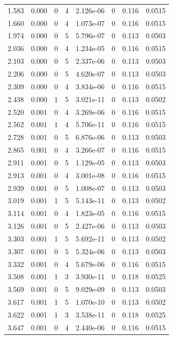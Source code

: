 \documentclass[preview]{standalone}
\begin{document}
{{\begin{tabular}{L{1.2cm}C{1.2cm} C{0.3cm}C{0.5cm} C{1.4cm}C{1.4cm} C{1.4cm}C{1.4cm}}
  1.583  &  0.000  & 0     &  4 &  2.126e-06  & 0  & 0.116 &  0.0515   \\ 
  1.660  &  0.000  & 0     &  4 &  1.073e-07  & 0  & 0.116 &  0.0515   \\ 
  1.974  &  0.000  & 0     &  5 &  5.796e-07  & 0  & 0.113 &  0.0503   \\ 
  2.036  &  0.000  & 0     &  4 &  1.234e-05  & 0  & 0.116 &  0.0515   \\ 
  2.103  &  0.000  & 0     &  5 &  2.337e-06  & 0  & 0.113 &  0.0503   \\ 
  2.206  &  0.000  & 0     &  5 &  4.620e-07  & 0  & 0.113 &  0.0503   \\ 
  2.309  &  0.000  & 0     &  4 &  3.834e-06  & 0  & 0.116 &  0.0515   \\ 
  2.438  &  0.000  & 1     &  5 &  3.021e-11  & 0  & 0.113 &  0.0502   \\ 
  2.520  &  0.001  & 0     &  4 &  3.269e-06  & 0  & 0.116 &  0.0515   \\ 
  2.562  &  0.001  & 1     &  4 &  5.706e-11  & 0  & 0.116 &  0.0515   \\ 
  2.728  &  0.001  & 0     &  5 &  6.876e-06  & 0  & 0.113 &  0.0503   \\ 
  2.865  &  0.001  & 0     &  4 &  3.266e-07  & 0  & 0.116 &  0.0515   \\ 
  2.911  &  0.001  & 0     &  5 &  1.129e-05  & 0  & 0.113 &  0.0503   \\ 
  2.913  &  0.001  & 0     &  4 &  3.001e-08  & 0  & 0.116 &  0.0515   \\ 
  2.939  &  0.001  & 0     &  5 &  1.008e-07  & 0  & 0.113 &  0.0503   \\ 
  3.019  &  0.001  & 1     &  5 &  5.143e-11  & 0  & 0.113 &  0.0502   \\ 
  3.114  &  0.001  & 0     &  4 &  1.823e-05  & 0  & 0.116 &  0.0515   \\ 
  3.126  &  0.001  & 0     &  5 &  2.427e-06  & 0  & 0.113 &  0.0503   \\ 
  3.303  &  0.001  & 1     &  5 &  5.692e-11  & 0  & 0.113 &  0.0502   \\ 
  3.307  &  0.001  & 0     &  5 &  5.324e-06  & 0  & 0.113 &  0.0503   \\ 
  3.332  &  0.001  & 0     &  4 &  5.679e-06  & 0  & 0.116 &  0.0515   \\ 
  3.508  &  0.001  & 1     &  3 &  3.930e-11  & 0  & 0.118 &  0.0525   \\ 
  3.569  &  0.001  & 0     &  5 &  9.029e-09  & 0  & 0.113 &  0.0503   \\ 
  3.617  &  0.001  & 1     &  5 &  1.070e-10  & 0  & 0.113 &  0.0502   \\ 
  3.622  &  0.001  & 1     &  3 &  3.538e-11  & 0  & 0.118 &  0.0525   \\ 
  3.647  &  0.001  & 0     &  4 &  2.440e-06  & 0  & 0.116 &  0.0515   \\ 
\hline 
\end{tabular} 

}}
\end{document}

